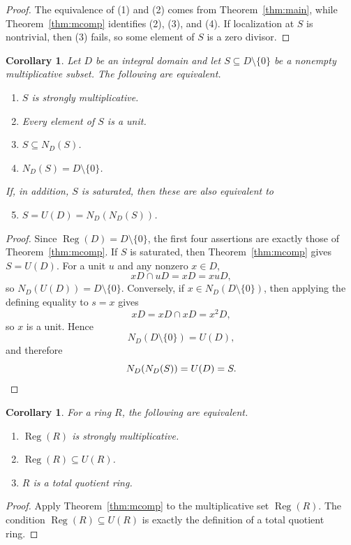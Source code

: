 \documentclass[11pt]{amsart}
\newtheorem{corollary}[theorem]{Corollary}
\theoremstyle{definition}
\theoremstyle{remark}
\newcommand{\Reg}{\operatorname{Reg}}
\begin{document}
\begin{proof}
The equivalence of (1) and (2) comes from Theorem~\ref{thm:main}, while Theorem~\ref{thm:mcomp} identifies (2), (3), and (4).
If localization at $S$ is nontrivial, then (3) fails, so some element of $S$ is a zero divisor.
\end{proof}

\begin{corollary}\label{cor:domain}
Let $D$ be an integral domain and let $S \subseteq D \setminus \{0\}$ be a nonempty multiplicative subset.
The following are equivalent.
\begin{enumerate}
\item $S$ is strongly multiplicative.
\item Every element of $S$ is a unit.
\item $S \subseteq N_D(S)$.
\item $N_D(S)=D \setminus \{0\}$.
\end{enumerate}
If, in addition, $S$ is saturated, then these are also equivalent to
\begin{enumerate}
\setcounter{enumi}{4}
\item $S=U(D)=N_D(N_D(S))$.
\end{enumerate}
\end{corollary}

\begin{proof}
Since $\Reg(D)=D \setminus \{0\}$, the first four assertions are exactly those of Theorem~\ref{thm:mcomp}.
If $S$ is saturated, then Theorem~\ref{thm:mcomp} gives $S=U(D)$.
For a unit $u$ and any nonzero $x \in D$,
\[
xD \cap uD=xD=xuD,
\]
so $N_D(U(D))=D \setminus \{0\}$.
Conversely, if $x \in N_D(D \setminus \{0\})$, then applying the defining equality to $s=x$ gives
\[
xD=xD \cap xD=x^2D,
\]
so $x$ is a unit.
Hence
\[
N_D(D \setminus \{0\})=U(D),
\]
and therefore
\[
N_D(N_D(S))=U(D)=S. \qedhere
\]
\end{proof}

\begin{corollary}\label{cor:tqr}
For a ring $R$, the following are equivalent.
\begin{enumerate}
\item $\Reg(R)$ is strongly multiplicative.
\item $\Reg(R)\subseteq U(R)$.
\item $R$ is a total quotient ring.
\end{enumerate}
\end{corollary}

\begin{proof}
Apply Theorem~\ref{thm:mcomp} to the multiplicative set $\Reg(R)$.
The condition $\Reg(R)\subseteq U(R)$ is exactly the definition of a total quotient ring.
\end{proof}
\end{document}
